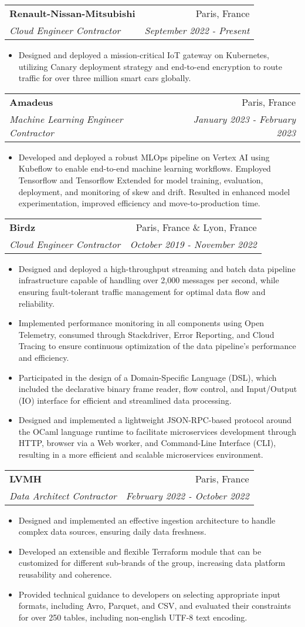 \documentclass[letterpaper,11pt]{article}
\makeatletter
\newcommand{\resumeItem}[1]{
  \item\small{#1 \vspace{-2pt}}
}
\newcommand{\resumeSubheading}[4]{
  \vspace{-1pt}\item
    \begin{tabular*}{0.97\textwidth}[t]{l@{\extracolsep{\fill}}r}
      \textbf{#1} & #2 \\
      \textit{\small#3} & \textit{\small #4} \\
    \end{tabular*}\vspace{-5pt}
}
\newcommand{\resumeItemListStart}{\begin{itemize}}
\newcommand{\resumeItemListEnd}{\end{itemize}\vspace{-5pt}}
\makeatother
\begin{document}
\resumeSubheading{Renault-Nissan-Mitsubishi}
{Paris, France}
{Cloud Engineer Contractor}
{September 2022 - Present}
\resumeItemListStart{}
\resumeItem{
	Designed and deployed a mission-critical IoT gateway on Kubernetes, utilizing
	Canary deployment strategy and end-to-end encryption to route traffic for over
	three million smart cars globally.
}
\resumeItemListEnd{}


\resumeSubheading{Amadeus}
{Paris, France}
{Machine Learning Engineer Contractor}
{January 2023 - February 2023}
\resumeItemListStart{}
\resumeItem{
	Developed and deployed a robust MLOps pipeline on Vertex AI using Kubeflow to
	enable end-to-end machine learning workflows. Employed Tensorflow and Tensorflow
	Extended for model training, evaluation, deployment, and monitoring of skew and
	drift. Resulted in enhanced model experimentation, improved efficiency and
	move-to-production time.
}
\resumeItemListEnd{}


\resumeSubheading{Birdz}
{Paris, France \& Lyon, France}
{Cloud Engineer Contractor}
{October 2019 - November 2022}
\resumeItemListStart{}
\resumeItem{
	Designed and deployed a high-throughput streaming and batch data pipeline
	infrastructure capable of handling over 2,000 messages per second, while ensuring
	fault-tolerant traffic management for optimal data flow and reliability.
}
\resumeItem{
	Implemented performance monitoring in all components using Open Telemetry,
	consumed through Stackdriver, Error Reporting, and Cloud Tracing to ensure
	continuous optimization of the data pipeline's performance and efficiency.
}
\resumeItem{
	Participated in the design of a Domain-Specific Language (DSL), which included the
	declarative binary frame reader, flow control, and Input/Output (IO) interface
	for efficient and streamlined data processing.
}
\resumeItem{
	Designed and implemented a lightweight JSON-RPC-based protocol around the
	OCaml language runtime to facilitate microservices development through HTTP,
	browser via a Web worker, and Command-Line Interface (CLI), resulting in a more
	efficient and scalable microservices environment.
}
\resumeItemListEnd{}


\resumeSubheading{LVMH}
{Paris, France}
{Data Architect Contractor}
{February 2022 - October 2022}
\resumeItemListStart{}
\resumeItem{
	Designed and implemented an effective ingestion architecture to handle complex
	data sources, ensuring daily data freshness.
}
\resumeItem{
	Developed an extensible and flexible Terraform module that can be customized for
	different sub-brands of the group, increasing data platform reusability and
	coherence.
}
\resumeItem{
	Provided technical guidance to developers on selecting appropriate input formats,
	including Avro, Parquet, and CSV, and evaluated their constraints for over 250
	tables, including non-english UTF-8 text encoding.
}
\resumeItemListEnd{}
\end{document}
